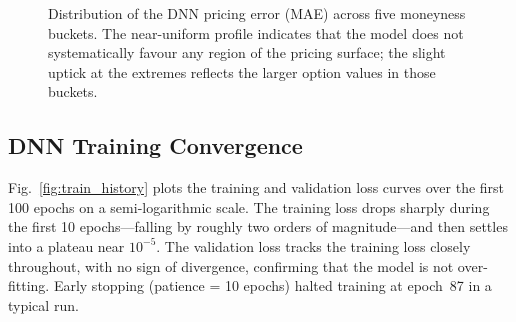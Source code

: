 \documentclass[conference]{IEEEtran}
\begin{document}
\begin{figure}[htbp]
\centering
{}
\caption{Distribution of the DNN pricing error (MAE) across five moneyness buckets. The near-uniform profile indicates that the model does not systematically favour any region of the pricing surface; the slight uptick at the extremes reflects the larger option values in those buckets.}
\label{fig:error_dist}
\end{figure}

\subsection{DNN Training Convergence}

Fig.~\ref{fig:train_history} plots the training and validation loss curves over the first 100 epochs on a semi-logarithmic scale. The training loss drops sharply during the first 10 epochs---falling by roughly two orders of magnitude---and then settles into a plateau near $10^{-5}$. The validation loss tracks the training loss closely throughout, with no sign of divergence, confirming that the model is not over-fitting. Early stopping (patience = 10 epochs) halted training at epoch~87 in a typical run.
\end{document}
